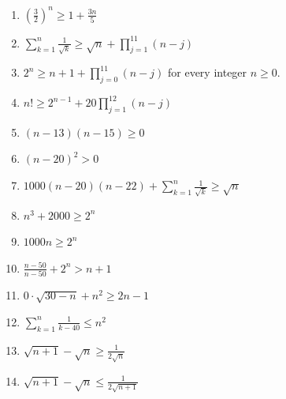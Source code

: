 \documentclass[11pt,a4paper]{article}
\begin{document}
\begin{enumerate}
\item $\displaystyle \left(\frac{3}{2}\right)^{n} \ge 1 + \frac{3n}{5}$
\item $\displaystyle \sum_{k=1}^{n} \frac{1}{\sqrt{k}} \ge \sqrt{n} + \prod_{j=1}^{11} \left(n - j\right)$
\item $\displaystyle 2^{n} \ge n + 1 + \prod_{j=0}^{11} \left(n - j\right)$ for every integer $n\ge 0$.
\item $\displaystyle n! \ge 2^{n - 1} + 20 \prod_{j=1}^{12} \left(n - j\right)$
\item $\displaystyle \left(n - 13\right)\left(n - 15\right) \ge 0$
\item $\displaystyle \left(n - 20\right)^{2} > 0$
\item $\displaystyle 1000\left(n - 20\right)\left(n - 22\right) + \sum_{k=1}^{n} \frac{1}{\sqrt{k}} \ge \sqrt{n}$
\item $\displaystyle n^{3} + 2000 \ge 2^{n}$
\item $\displaystyle 1000n \ge 2^{n}$
\item $\displaystyle \frac{n - 50}{n - 50} + 2^{n} > n + 1$
\item $\displaystyle 0 \cdot \sqrt{30 - n} + n^{2} \ge 2n - 1$
\item $\displaystyle \sum_{k=1}^{n} \frac{1}{k - 40} \le n^{2}$
\item $\displaystyle \sqrt{n + 1} - \sqrt{n} \ge \frac{1}{2\sqrt{n}}$
\item $\displaystyle \sqrt{n + 1} - \sqrt{n} \le \frac{1}{2\sqrt{n + 1}}$
\end{enumerate}
\end{document}
